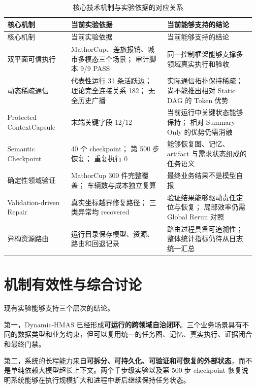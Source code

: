 \documentclass[UTF8,a4paper,12pt,oneside]{ctexbook}
\begin{document}
\begin{longtable}{p{}p{}p{}}
\caption{核心技术机制与实验依据的对应关系}
\label{tab:mechanism-evidence-mapping}\\
\toprule
核心机制 & 当前实验依据 & 当前能够支持的结论\\
\midrule
\endfirsthead

\toprule
核心机制 & 当前实验依据 & 当前能够支持的结论\\
\midrule
\endhead

双平面可信执行
&
MathorCup、差旅报销、城市多模态三个场景；
审计脚本 9/9 PASS
&
同一控制框架能够支撑多领域真实执行和验收
\\

动态稀疏通信
&
代表性运行 31 条活跃边；
理论完全连接关系 182；
无全历史广播
&
实际通信拓扑保持稀疏；
尚不能推出相对 Static DAG 的 Token 优势
\\

Protected ContextCapsule
&
末端关键字段 12/12
&
当前运行中关键状态能够保持；
相对 Summary Only 的优势仍需消融
\\

Semantic Checkpoint
&
40 个 checkpoint；
第 500 步恢复；
重复执行 0
&
能够恢复图、记忆、artifact 与需求状态组成的任务语义
\\

确定性领域验证
&
MathorCup 300 件完整覆盖；
车辆数与成本独立复算
&
最终业务结果不是模型自报
\\

Validation-driven Repair
&
真实坐标越界修复路径；
三类异常均 recovered
&
验证结果能够驱动责任定位与恢复；
局部效率仍需 Global Rerun 对照
\\

异构资源路由
&
运行目录保存模型、资源、路由和回退记录
&
路由过程具备可追溯性；
整体统计指标仍待从日志统一汇总
\\

\bottomrule
\end{longtable}


\section{机制有效性与综合讨论}

现有实验能够支持三个层次的结论。

第一，Dynamic-HMAS 已经形成\textbf{可运行的跨领域自治闭环}。三个业务场景具有不同的数据类型和业务约束，但可以复用统一的任务图、记忆、真实执行、证据闭合和最终门禁。

第二，系统的长程能力来自\textbf{可拆分、可持久化、可验证和可恢复的外部状态}，而不是单纯依赖大模型超长上下文。两个千步级实验以及第 500 步 checkpoint 恢复说明系统能够在执行规模扩大和进程中断后继续保持任务状态。
\end{document}

